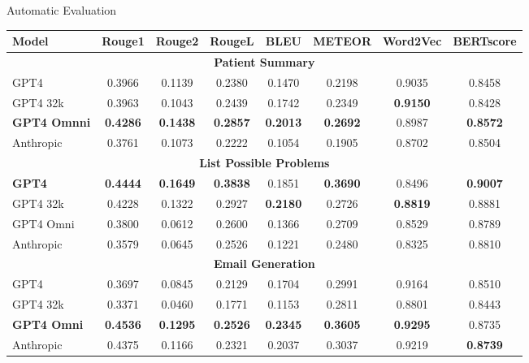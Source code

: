 \documentclass[usenames,dvipsnames]{beamer}
\begin{document}
\begin{frame}[shrink=30]{Automatic Evaluation}
  
  \vspace{10mm}
  \centering
  \begin{threeparttable}
    \setlength{\extrarowheight}{2pt}
    \begin{tabular}{|l|c|c|c|c|c|c|c|}
    \hline
    Model & Rouge1 & Rouge2 & RougeL & BLEU & METEOR & Word2Vec & BERTscore \\
    \hline
    \multicolumn{8}{|c|}{\textbf{Patient Summary}} \\
    \hline
    GPT4      & 0.3966 & 0.1139 & 0.2380 & 0.1470 & 0.2198 & 0.9035 & 0.8458 \\
    GPT4 32k  & 0.3963 & 0.1043 & 0.2439 & 0.1742 & 0.2349 & \textbf{0.9150} & 0.8428 \\
    \textbf{GPT4 Omnni}     & \textbf{0.4286} & \textbf{0.1438} & \textbf{0.2857} & \textbf{0.2013} & \textbf{0.2692} & 0.8987 & \textbf{0.8572} \\
    Anthropic & 0.3761 & 0.1073 & 0.2222 & 0.1054 & 0.1905 & 0.8702 & 0.8504 \\
    \hline
    \multicolumn{8}{|c|}{\textbf{List Possible Problems}} \\
    \hline
    \textbf{GPT4}      & \textbf{0.4444} & \textbf{0.1649} & \textbf{0.3838} & 0.1851 & \textbf{0.3690} & 0.8496 & \textbf{0.9007} \\
    GPT4 32k  & 0.4228 & 0.1322 & 0.2927 & \textbf{0.2180} & 0.2726 & \textbf{0.8819} & 0.8881 \\
    GPT4 Omni     & 0.3800 & 0.0612 & 0.2600 & 0.1366 & 0.2709 & 0.8529 & 0.8789 \\
    Anthropic & 0.3579 & 0.0645 & 0.2526 & 0.1221 & 0.2480 & 0.8325 & 0.8810 \\
    \hline
    \multicolumn{8}{|c|}{\textbf{Email Generation}} \\
    \hline
    GPT4      & 0.3697 & 0.0845 & 0.2129 & 0.1704 & 0.2991 & 0.9164 & 0.8510 \\
    GPT4 32k  & 0.3371 & 0.0460 & 0.1771 & 0.1153 & 0.2811 & 0.8801 & 0.8443 \\
    \textbf{GPT4 Omni}     & \textbf{0.4536} & \textbf{0.1295} & \textbf{0.2526} & \textbf{0.2345} & \textbf{0.3605} & \textbf{0.9295} & 0.8735 \\
    Anthropic & 0.4375 & 0.1166 & 0.2321 & 0.2037 & 0.3037 & 0.9219 & \textbf{0.8739} \\
    \hline
    \end{tabular}
  \end{threeparttable}
\end{frame}
\end{document}
